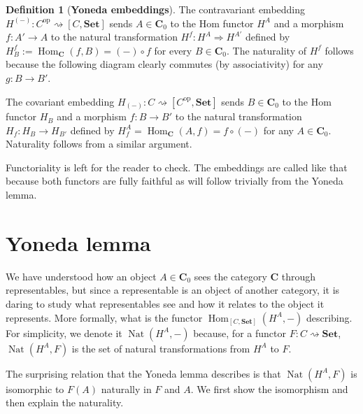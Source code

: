 \documentclass{article}
\theoremstyle{definition}
\newtheorem{defn}[thm]{Definition}
\theoremstyle{remark}
\DeclareMathOperator{\Hom}{Hom}
\DeclareMathOperator{\Nat}{Nat}
\newcommand{\op}[1]{#1^{\text{op}}}
\begin{document}
\begin{defn}[\textbf{Yoneda embeddings}]
	The contravariant embedding $H^{(-)}: \op{C} \rightsquigarrow [C, \textbf{Set}]$ sends $A \in \mathbf{C}_0$ to the Hom functor $H^A$ and a morphism $f: A'\rightarrow A$ to the natural transformation $H^f: H^{A} \Rightarrow H^{A'}$ defined by $H^f_B := \Hom_{\mathbf{C}}(f,B) = (-) \circ f$ for every $B \in \mathbf{C}_0$. The naturality of $H^f$ follows because the following diagram clearly commutes (by associativity) for any $g: B\rightarrow B'$.
	\begin{figure}[h]
		\centering
	\end{figure}
	
	The covariant embedding $H_{(-)}:C \rightsquigarrow [\op{C}, \textbf{Set}]$ sends $B \in \mathbf{C}_0$ to the Hom functor $H_B$ and a morphism $f:B\rightarrow B'$ to the natural transformation $H_f:H_B \rightarrow H_{B'}$ defined by $H_f^A = \Hom_{\mathbf{C}}(A,f) = f\circ (-)$ for any $A \in \mathbf{C}_0$. Naturality follows from a similar argument.
\end{defn}
Functoriality is left for the reader to check. The embeddings are called like that because both functors are fully faithful as will follow trivially from the Yoneda lemma.


\section{Yoneda lemma}
We have understood how an object $A \in \mathbf{C}_0$ sees the category $\mathbf{C}$ through representables, but since a representable is an object of another category, it is daring to study what representables see and how it relates to the object it represents. More formally, what is the functor $\Hom_{[C, \textbf{Set}]}(H^A, -)$ describing. For simplicity, we denote it $\Nat(H^A,-)$ because, for a functor $F:C \rightsquigarrow \textbf{Set}$, $\Nat(H^A,F)$ is the set of natural transformations from $H^A$ to $F$. %

The surprising relation that the Yoneda lemma describes is that $\Nat(H^A,F)$ is isomorphic to $F(A)$ naturally in $F$ and $A$. We first show the isomorphism and then explain the naturality.
\end{document}
